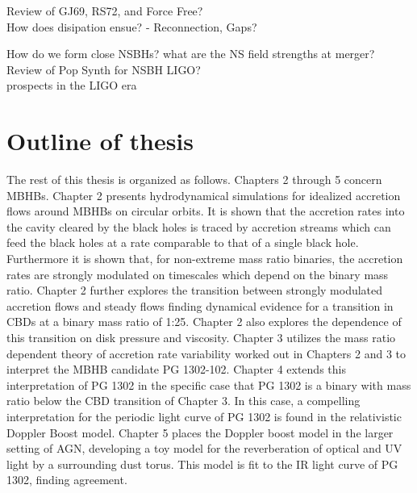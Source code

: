 Review of GJ69, RS72, and Force Free?\\
How does disipation ensue? - Reconnection, Gaps?

How do we form close NSBHs?
what are the NS field strengths at merger?\\

Review of Pop Synth for NSBH LIGO?\\
prospects in the LIGO era









\section{Outline of thesis}  
The rest of this thesis is organized as follows.
Chapters 2 through 5 concern MBHBs. Chapter 2 presents hydrodynamical
simulations for idealized accretion flows around MBHBs on circular orbits. It
is shown that the accretion rates into the cavity cleared by the black holes
is traced by accretion streams which can feed the black holes at a rate
comparable to that of a single black hole. Furthermore it is shown that, for
non-extreme mass ratio binaries, the accretion rates are strongly modulated on
timescales which depend on the binary mass ratio. Chapter 2 further explores
the transition between strongly modulated accretion flows and steady flows
finding dynamical evidence for a transition in CBDs at a binary mass ratio of
1:25. Chapter 2 also explores the dependence of this transition on disk
pressure and viscosity. Chapter 3 utilizes the mass ratio dependent theory of
accretion rate variability worked out in Chapters 2 and 3 to interpret the
MBHB candidate PG 1302-102. Chapter 4 extends this interpretation of PG 1302
in the specific case that PG 1302 is a binary with mass ratio below the CBD
transition of Chapter 3. In this case, a compelling interpretation for the
periodic light curve of PG 1302 is found in the relativistic Doppler Boost
model. Chapter 5 places the Doppler boost model in the larger setting of AGN,
developing a toy model for the reverberation of optical and UV light by a
surrounding dust torus. This model is fit to the IR light curve of PG 1302,
finding agreement.

